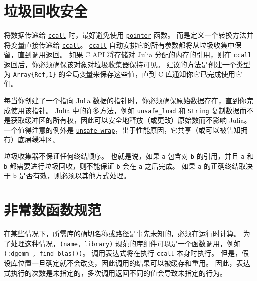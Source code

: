 \hypertarget{6047327473342163880}{}


\section{垃圾回收安全}



将数据传递给 \hyperlink{14245046751182637566}{\texttt{ccall}} 时，最好避免使用 \hyperlink{8901246211940014300}{\texttt{pointer}} 函数。 而是定义一个转换方法并将变量直接传递给 \hyperlink{14245046751182637566}{\texttt{ccall}}。 \hyperlink{14245046751182637566}{\texttt{ccall}} 自动安排它的所有参数都将从垃圾收集中保留，直到调用返回。 如果 C API 将存储对 Julia 分配的内存的引用，则在 \hyperlink{14245046751182637566}{\texttt{ccall}} 返回后，你必须确保该对象对垃圾收集器保持可见。 建议的方法是创建一个类型为 \texttt{Array\{Ref,1\}} 的全局变量来保存这些值，直到 C 库通知你它已完成使用它们。



每当你创建了一个指向 Julia 数据的指针时，你必须确保原始数据存在，直到你完成使用该指针。 Julia 中的许多方法，例如 \hyperlink{13744149973765810952}{\texttt{unsafe\_load}} 和 \hyperlink{2825695355940841177}{\texttt{String}} 复制数据而不是获取缓冲区的所有权，因此可以安全地释放（或更改）原始数而不影响 Julia。 一个值得注意的例外是 \hyperlink{2210267857349684744}{\texttt{unsafe\_wrap}}，出于性能原因，它共享（或可以被告知拥有）底层缓冲区。



垃圾收集器不保证任何终结顺序。 也就是说，如果 \texttt{a} 包含对 \texttt{b} 的引用，并且 \texttt{a} 和 \texttt{b} 都需要进行垃圾回收，则不能保证 \texttt{b} 会在 \texttt{a} 之后完成。 如果 \texttt{a} 的正确终结取决于 \texttt{b} 是否有效，则必须以其他方式处理。



\hypertarget{14397309909238125480}{}


\section{非常数函数规范}



在某些情况下，所需库的确切名称或路径是事先未知的，必须在运行时计算。 为了处理这种情况，\texttt{(name, library)} 规范的库组件可以是一个函数调用，例如 \texttt{(:dgemm\_, find\_blas())}。 调用表达式将在执行 \texttt{ccall} 本身时执行。 但是，假设库位置一旦确定就不会改变，因此调用的结果可以被缓存和重用。 因此，表达式执行的次数是未指定的，多次调用返回不同的值会导致未指定的行为。



